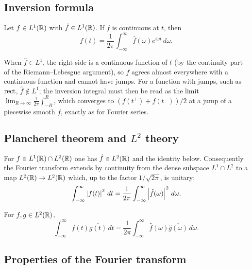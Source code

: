 \begin{notechapter}
\subsection{Inversion formula}

\begin{theorem}
Let $f \in L^1(\mathbb{R})$ with $\hat{f} \in L^1(\mathbb{R})$. If $f$ is continuous at $t$, then
\[
f(t) = \frac{1}{2\pi} \int_{-\infty}^{\infty} \hat{f}(\omega) e^{i\omega t} \, d\omega.
\]
\end{theorem}

\begin{remark}
When $\hat f \in L^1$, the right side is a continuous function of $t$ (by the continuity part of the Riemann--Lebesgue argument), so $f$ agrees almost everywhere with a continuous function and cannot have jumps. For a function with jumps, such as $\operatorname{rect}$, $\hat f \notin L^1$; the inversion integral must then be read as the limit $\lim_{R\to\infty}\frac1{2\pi}\int_{-R}^R$, which converges to $(f(t^+)+f(t^-))/2$ at a jump of a piecewise smooth $f$, exactly as for Fourier series.
\end{remark}

\subsection{Plancherel theorem and $L^2$ theory}

\begin{theorem}\label{fourier-analysis:thm:plancherel}
For $f \in L^1(\mathbb{R})\cap L^2(\mathbb{R})$ one has $\hat f \in L^2(\mathbb{R})$ and the identity below. Consequently the Fourier transform extends by continuity from the dense subspace $L^1\cap L^2$ to a map $L^2(\mathbb{R}) \to L^2(\mathbb{R})$ which, up to the factor $1/\sqrt{2\pi}$, is unitary:
\[
\int_{-\infty}^{\infty} \left|f(t)\right|^2 \, dt = \frac{1}{2\pi} \int_{-\infty}^{\infty} \left|\hat{f}(\omega)\right|^2 \, d\omega.
\]
\end{theorem}

\begin{corollary}
For $f, g \in L^2(\mathbb{R})$,
\[
\int_{-\infty}^{\infty} f(t) \overline{g(t)} \, dt = \frac{1}{2\pi} \int_{-\infty}^{\infty} \hat{f}(\omega) \overline{\hat{g}(\omega)} \, d\omega.
\]
\end{corollary}

\subsection{Properties of the Fourier transform}


\end{notechapter}
